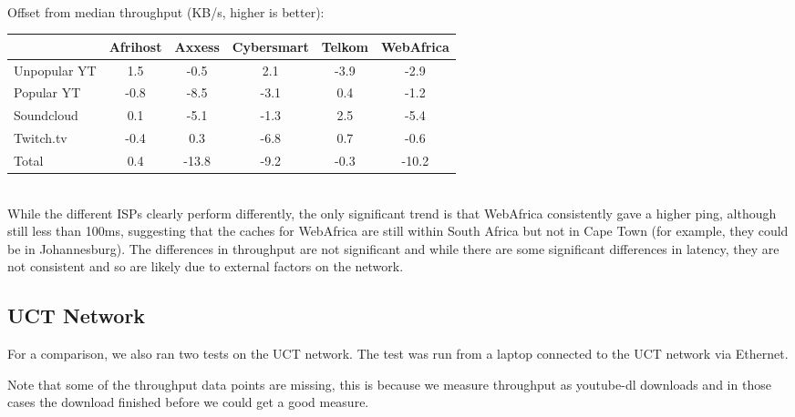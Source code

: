 \documentclass{sig-alternate-05-2015}
\begin{document}
\vspace{1em} \\
Offset from median throughput (KB/s, higher is better): \\
{\small
\begin{tabular}{|l|c|c|c|c|c|} \hline
 & \small{Afrihost} & \small{Axxess} & \small{Cybersmart} & \small{Telkom} & \small{WebAfrica} \\ \hline
\small{Unpopular YT} & 1.5  & -0.5  & 2.1   & -3.9 & -2.9 \\ \hline
Popular YT           & -0.8 & -8.5  & -3.1  & 0.4  & -1.2 \\ \hline
Soundcloud           & 0.1  & -5.1  & -1.3  & 2.5  & -5.4 \\ \hline
Twitch.tv            & -0.4 & 0.3   & -6.8  & 0.7  & -0.6 \\ \hline
Total                & 0.4  & -13.8 & -9.2  & -0.3 & -10.2\\ \hline
\end{tabular}}
\vspace{1em} \\
While the different ISPs clearly perform differently, the only significant trend is that WebAfrica consistently gave a higher ping, although still less than 100ms, suggesting that the caches for WebAfrica are still within South Africa but not in Cape Town (for example, they could be in Johannesburg). The differences in throughput are not significant and while there are some significant differences in latency, they are not consistent and so are likely due to external factors on the network.

\subsection{UCT Network}
For a comparison, we also ran two tests on the UCT network. The test was run from a laptop connected to the UCT network via Ethernet.

Note that some of the throughput data points are missing, this is because we measure throughput as youtube-dl downloads and in those cases the download finished before we could get a good measure.
\end{document}
